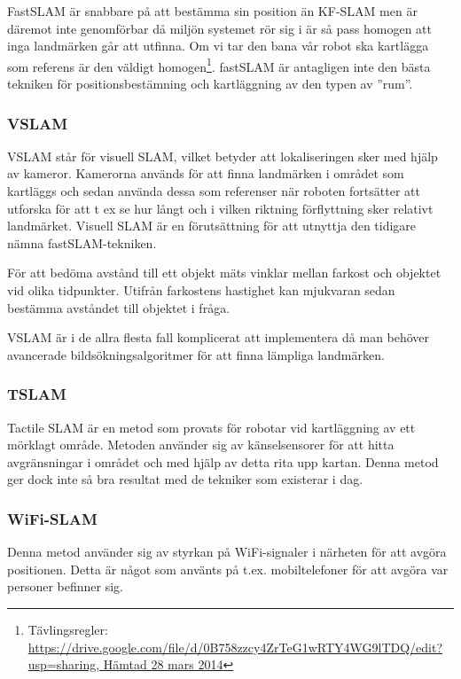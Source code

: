 \documentclass[a4paper,12pt,fleqn]{article}
\begin{document}
FastSLAM är snabbare på att bestämma sin position än KF-SLAM men är däremot inte genomförbar då miljön systemet rör sig i är så pass homogen att inga landmärken går att utfinna. Om vi tar den bana vår robot ska kartlägga som referens är den väldigt homogen\footnote{Tävlingsregler: \url{https://drive.google.com/file/d/0B758zzcy4ZrTeG1wRTY4WG9lTDQ/edit?usp=sharing, Hämtad 28 mars 2014}}. fastSLAM är antagligen inte den bästa tekniken för positionsbestämning och kartläggning av den typen av ''rum''. 



\subsubsection{VSLAM}

VSLAM står för visuell SLAM, vilket betyder att lokaliseringen sker med hjälp av kameror. Kamerorna används för att finna landmärken i området som kartläggs och sedan använda dessa som referenser när roboten fortsätter att utforska för att t ex se hur långt och i vilken riktning förflyttning sker relativt landmärket. Visuell SLAM är en förutsättning för att utnyttja den tidigare nämna fastSLAM-tekniken. 

För att bedöma avstånd till ett objekt mäts vinklar mellan farkost och objektet vid olika tidpunkter. Utifrån farkostens hastighet kan mjukvaran sedan bestämma avståndet till objektet i fråga. 

VSLAM är i de allra flesta fall komplicerat att implementera då man behöver avancerade bildsökningsalgoritmer för att finna lämpliga landmärken. 

\subsubsection{TSLAM}
Tactile SLAM är en metod som provats för robotar vid kartläggning av ett mörklagt område. Metoden använder sig av känselsensorer för att hitta avgränsningar i området och med hjälp av detta rita upp kartan. Denna metod ger dock inte så bra resultat med de tekniker som existerar i dag.

\subsubsection{WiFi-SLAM}
Denna metod använder sig av styrkan på WiFi-signaler i närheten för att avgöra positionen. Detta är något som använts på t.ex. mobiltelefoner för att avgöra var personer befinner sig. 
\end{document}
